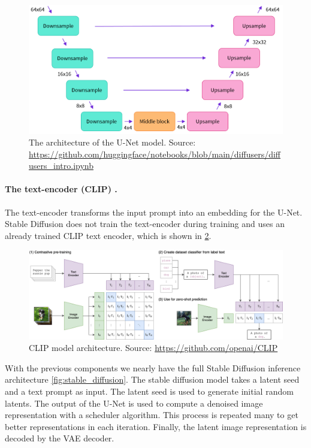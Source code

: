 \begin{figure}[ht]
    \centering
    \includegraphics[width=\linewidth]{images/diffusion/unet-model.png}
    \caption{The architecture of the U-Net model. Source: \url{https://github.com/huggingface/notebooks/blob/main/diffusers/diffusers_intro.ipynb}}
    \label{fig:unet_model}
\end{figure}

\paragraph{The text-encoder (CLIP) \cite{radford2021clip}.} The text-encoder transforms the input prompt into an embedding for the U-Net. Stable Diffusion does not train the text-encoder during training and uses an already trained CLIP text encoder, which is shown in \cref{fig:clip}.

\begin{figure}[ht]
    \centering
    \includegraphics[width=\linewidth]{images/diffusion/clip.png}
    \caption{CLIP model architecture. Source: \url{https://github.com/openai/CLIP}}
    \label{fig:clip}
\end{figure}

With the previous components we nearly have the full Stable Diffusion inference architecture \cref{fig:stable_diffusion}. The stable diffusion model takes a latent seed and a text prompt as input. The latent seed is  used to generate initial random latents. The output of the U-Net is used to compute a denoised image representation with a scheduler algorithm. This process is repeated many to get better representations in each iteration. Finally, the latent image representation is decoded by the VAE decoder.

